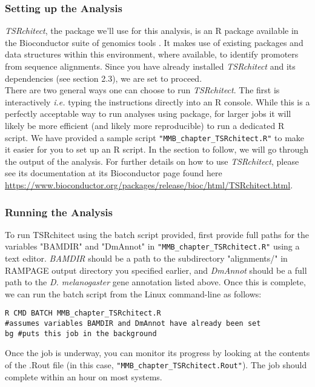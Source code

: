 \documentclass[runningheads,a4paper]{llncs}
\begin{document}
\begin{linenumbers}
\begin{itemize}
\subsubsection{Setting up the Analysis}
\textit{TSRchitect}, the package we'll use for this analysis, is an R package available in the Bioconductor suite of genomics tools \cite{Lawrence:2014gy}.
It makes use of existing packages and data structures within this environment, where available, to identify promoters from sequence alignments.
Since you have already installed \textit{TSRchitect} and its dependencies (see section 2.3), we are set to proceed. \\
There are two general ways one can choose to run \textit{TSRchitect}. 
The first is interactively \textit{i.e.} typing the instructions directly into an R console.
While this is a perfectly acceptable way to run analyses using package, for larger jobs it will likely be more efficient (and likely more reproducible) to run a dedicated R script.
We have provided a sample script \texttt{"MMB\_chapter\_TSRchitect.R"} to make it easier for you to set up an R script. 
In the section to follow, we will go through the output of the analysis. 
For further details on how to use \textit{TSRchitect}, please see its documentation at its Bioconductor page found here \url{https://www.bioconductor.org/packages/release/bioc/html/TSRchitect.html}.  \\

\subsubsection{Running the Analysis}
To run TSRchitect using the batch script provided, first provide full paths for the variables "BAMDIR" and "DmAnnot" in \texttt{"MMB\_chapter\_TSRchitect.R"} using a text editor. 
\textit{BAMDIR} should be a path to the subdirectory "alignments/" in RAMPAGE output directory you specified earlier, and \textit{DmAnnot} should be a full path to the \textit{D. melanogaster} gene annotation listed above.
Once this is complete, we can run the batch script from the Linux command-line as follows:

\noindent
\begin{verbatim}
R CMD BATCH MMB_chapter_TSRchitect.R
#assumes variables BAMDIR and DmAnnot have already been set
bg #puts this job in the background
\end{verbatim}

Once the job is underway, you can monitor its progress by looking at the contents of the .Rout file (in this case, \texttt{"MMB\_chapter\_TSRchitect.Rout"}). 
The job should complete within an hour on most systems. \\


\end{itemize}
\end{linenumbers}
\end{document}
